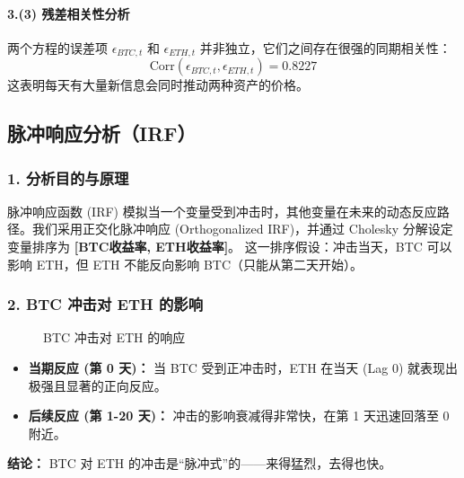 \documentclass[a4paper]{ctexart}
\begin{document}
	\paragraph{3.(3) 残差相关性分析}
	两个方程的误差项 $\epsilon_{BTC,t}$ 和 $\epsilon_{ETH,t}$ 并非独立，它们之间存在很强的同期相关性：
	$$ \text{Corr}(\epsilon_{BTC,t}, \epsilon_{ETH,t}) = 0.8227 $$
	这表明每天有大量新信息会同时推动两种资产的价格。
	
	\subsection{脉冲响应分析（IRF）}
	\subsubsection{1. 分析目的与原理}
	脉冲响应函数 (IRF) 模拟当一个变量受到冲击时，其他变量在未来的动态反应路径。我们采用正交化脉冲响应 (Orthogonalized IRF)，并通过 Cholesky 分解设定变量排序为 \textbf{[BTC收益率, ETH收益率]}。
	这一排序假设：冲击当天，BTC 可以影响 ETH，但 ETH 不能反向影响 BTC（只能从第二天开始）。
	
	\subsubsection{2. BTC 冲击对 ETH 的影响}
	\begin{figure}[htbp]
		\centering
		\caption{BTC 冲击对 ETH 的响应}
		\label{fig:irf_btc_to_eth}
	\end{figure}
	\begin{itemize}
		\item \textbf{当期反应 (第 0 天)：} 当 BTC 受到正冲击时，ETH 在当天 (Lag 0) 就表现出极强且显著的正向反应。
		\item \textbf{后续反应 (第 1-20 天)：} 冲击的影响衰减得非常快，在第 1 天迅速回落至 0 附近。
	\end{itemize}
	\textbf{结论：} BTC 对 ETH 的冲击是“脉冲式”的——来得猛烈，去得也快。
	
\end{document}
